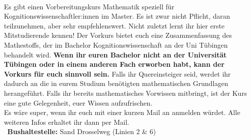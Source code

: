 \begin{description}


\ifkogwiss
    \ifmaster
        \item[\parbox{\linewidth}{Mathevorkurs-Master -- \kogniMasterMatheVorkursBeginn~bis \kogniMasterMatheVorkursEnde~\YEAR,\\ 09:00--17:00 Uhr, Sand C412}]\ \vspace{.355\baselineskip} \\ %
        Es gibt einen Vorbereitungskurs Mathematik speziell für Kognitionswissenschaftler:innen im Master.
        Es ist zwar nicht Pflicht, daran teilzunehmen, aber sehr empfehlenswert. Nicht zuletzt lernt ihr hier erste Mitstudierende kennen! Der Vorkurs bietet euch eine Zusammenfassung des Mathestoffs, der im Bachelor Kognitionswissenschaft an der Uni Tübingen behandelt wird.
        \textbf{Wenn ihr euren Bachelor nicht an der Universität Tübingen oder in einem anderen Fach erworben habt, kann der Vorkurs für euch sinnvoll sein.} Falls ihr Quereinsteiger seid, werdet ihr dadurch an die in eurem Studium benötigten mathematischen Grundlagen herangeführt. Falls ihr bereits mathematisches Vorwissen mitbringt, ist der Kurs eine gute Gelegenheit, euer Wissen aufzufrischen.\\
        Es wäre super, wenn ihr euch mit einer kurzen Mail an \texttt{\kogniMasterMatheVorkursAnmeldeMail} anmelden würdet. Alle weiteren Infos erhaltet ihr dann per Mail.\\
        ~\textbf{Bushaltestelle:} Sand Drosselweg (Linien 2 \& 6)
    \fi
\fi


\end{description}
